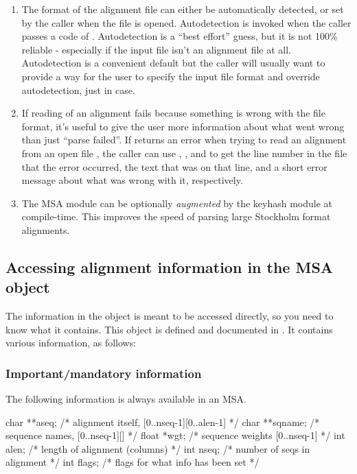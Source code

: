 \begin{enumerate}
\item The format of the alignment file can either be automatically
      detected, or set by the caller when the file is opened.
      Autodetection is invoked when the caller passes a 
      code of . Autodetection is a ``best
      effort'' guess, but it is not 100\% reliable - especially if the
      input file isn't an alignment file at all. Autodetection is a
      convenient default but the caller will usually want to provide a
      way for the user to specify the input file format and override
      autodetection, just in case.

\item If reading of an alignment fails because something is wrong with
      the file format, it's useful to give the user more information
      about what went wrong than just ``parse failed''. If
       returns an  error
      when trying to read an alignment from an open file ,
      the caller can use , ,
      and  to get the line number in the file that
      the error occurred, the text that was on that line, and a short
      error message about what was wrong with it, respectively.

\item The MSA module can be optionally \emph{augmented} by the keyhash
      module at compile-time. This improves the speed of parsing large 
      Stockholm format alignments.
\end{enumerate}

\subsection{Accessing alignment information in the MSA object}

The information in the  object is meant to be accessed
directly, so you need to know what it contains. This object is defined
and documented in . It contains various information, as
follows:

\subsubsection{Important/mandatory information}

The following information is always available in an MSA.

\begin{cchunk}
  char **aseq;                  /* alignment itself, [0..nseq-1][0..alen-1] */
  char **sqname;                /* sequence names, [0..nseq-1][]            */
  float *wgt;                   /* sequence weights [0..nseq-1]             */
  int    alen;                  /* length of alignment (columns)            */
  int    nseq;                  /* number of seqs in alignment              */
  int    flags;                 /* flags for what info has been set         */
\end{cchunk}

